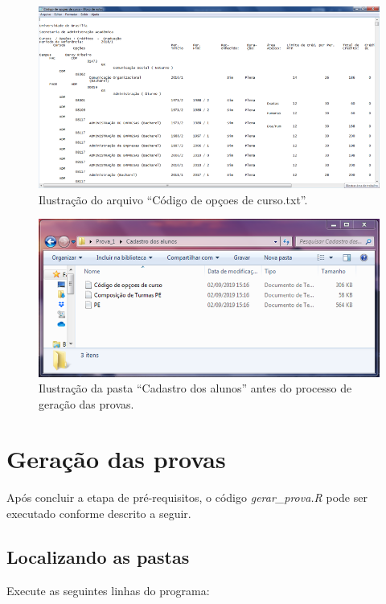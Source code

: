 \documentclass[a4paper]{report}
\begin{document}
\begin{figure}
\centering
\includegraphics{imagens/arquivo_opcaocurso.png}
\caption{Ilustração do arquivo ``Código de opçoes de curso.txt''.}
\end{figure}

\begin{figure}
\centering
\includegraphics{imagens/pasta_cadastroaluno.png}
\caption{Ilustração da pasta ``Cadastro dos alunos'' antes do processo
de geração das provas.}
\end{figure}

\section{Geração das provas}

Após concluir a etapa de pré-requisitos, o código \emph{gerar\_prova.R}
pode ser executado conforme descrito a seguir.

\subsection{Localizando as pastas}

Execute as seguintes linhas do programa:
\end{document}
